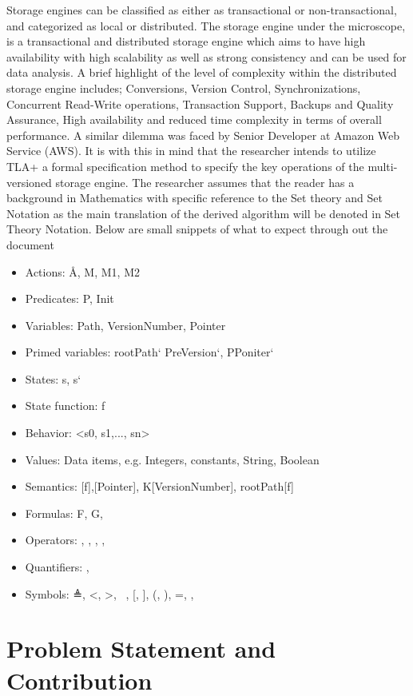 \documentclass[11pt,a4paper,oneside]{book} %
\numberwithin{equation}{section}
\begin{document}
Storage engines can be classified as
either as transactional or non-transactional, and categorized as local or distributed. The storage engine under the microscope, is a transactional and distributed storage engine which aims to have high availability with high scalability as well as strong consistency and can be used for data analysis. A brief highlight of the level of complexity within the distributed storage engine includes; Conversions, Version Control, Synchronizations, Concurrent Read-Write operations, Transaction Support, Backups and Quality Assurance, High availability and reduced time complexity in terms of overall performance. A similar dilemma was faced by Senior Developer
at Amazon Web Service (AWS). It is with this in mind that the researcher intends to utilize TLA+ a formal specification method to specify the key operations of the multi-versioned storage engine.
The researcher assumes that the reader has a background in Mathematics with specific reference to the Set theory and Set Notation as the main translation of the derived algorithm will be denoted in Set Theory Notation. Below are small snippets of what to expect through out the document
\begin{itemize}
\item Actions: Å, M, M1, M2
\item Predicates: P, Init
\item Variables: Path, VersionNumber, Pointer
\item Primed variables: rootPath` PreVersion`, PPoniter`
\item States: s, s`
\item State function: f
\item Behavior: <s0, s1,..., sn>
\item Values: Data items, e.g. Integers, constants, String, Boolean
\item Semantics: [f],[Pointer], K[VersionNumber], rootPath[f]
\item Formulas: F, G, \textPhi
\item Operators: \Box, \diamond, \neq, \vee, \wedge
\item Quantifiers: \forall,\exists
\item Symbols:  ≜, <, >, ~, [, ], (, ), =, \equiv, \cdots

\end{itemize}

\section{Problem Statement and Contribution}
\end{document}
